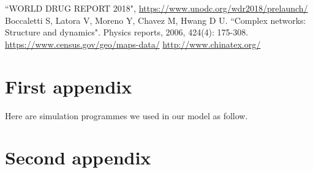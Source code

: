\documentclass{mcmthesis}
\begin{document}
\begin{thebibliography}{99}
	 ``WORLD DRUG REPORT 2018", \url{https://www.unodc.org/wdr2018/prelaunch/}
	 Boccaletti S, Latora V, Moreno Y, Chavez M, Hwang D U. ``Complex networks: Structure and dynamics". Physics reports, 2006, 424(4): 175-308.
	 \url{https://www.census.gov/geo/maps-data/}
	\url{http://www.chinatex.org/}
\end{thebibliography}


\begin{appendices}
	
	\section{First appendix}
	
	\lipsum[13]
	
	Here are simulation programmes we used in our model as follow.\\
	
	
	\section{Second appendix}
	
	
	
\end{appendices}
	
	
\end{document}
